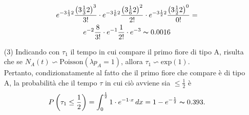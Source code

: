 \documentclass[11pt,largemargins]{homework}
\begin{document}
\begin{enumerate}
\begin{gather*}
    e^{-3\frac{1}{3}2}\frac{\left(3\frac{1}{3}2\right)^{3}}{3!}\cdot e^{-3\frac{1}{6}2}\frac{\left(3\frac{1}{6}2\right)^{2}}{2!}\cdot e^{-3\frac{1}{2}2}\frac{\left(3\frac{1}{2}2\right)^{0}}{0!}= \\
    e^{-2}\frac{8}{3!}\cdot e^{-1}\frac{1}{2!}\cdot e^{-3}\thicksim 0.0016  
  \end{gather*} 
     \item[(3)]
     Indicando con $\tau_{1}$ il tempo in cui compare il primo fiore di tipo A, risulta che se $N_{A}\left(t\right)\backsim \text{Poisson}\left(\lambda{p_{A}}=1\right)$, allora $\tau_{1}\backsim \text{exp}\left(1\right)$.\\
     Pertanto, condizionatamente al fatto che il primo fiore che compare è di tipo A, la probabilità che il tempo $\tau$ in cui ciò avviene sia $\leq \frac{1}{2}$ è
     \begin{equation*}
     P\left(\tau_{1}\leq \frac{1}{2}\right)=\int_{0}^{\frac{1}{2}}1\cdot e^{-1\cdot x} \,dx =1-e^{-\frac{1}{2}}\thicksim 0.393.
     \end{equation*}
     
  
    

  \end{enumerate}

  \newpage
\end{document}
